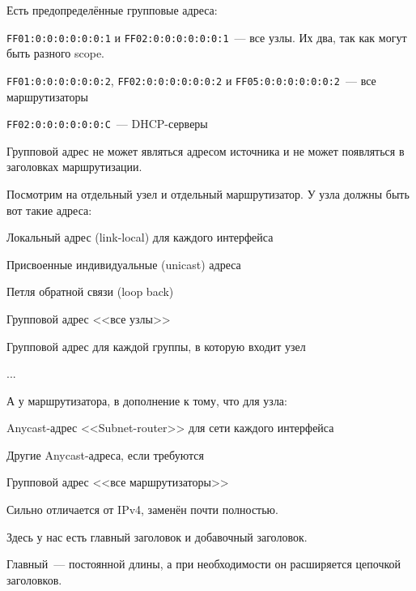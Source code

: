 Есть предопределённые групповые адреса:
\begin{MyItemize}
    \item {\tt FF01:0:0:0:0:0:0:1} и {\tt FF02:0:0:0:0:0:0:1}~--- все узлы. Их два, так как могут быть разного scope.
    \item {\tt FF01:0:0:0:0:0:0:2}, {\tt FF02:0:0:0:0:0:0:2} и {\tt FF05:0:0:0:0:0:0:2}~--- все маршрутизаторы
    \item {\tt FF02:0:0:0:0:0:0:С}~--- DHCP-серверы
\end{MyItemize}

Групповой адрес не может являться адресом источника и не может появляться в заголовках маршрутизации.


Посмотрим на отдельный узел и отдельный маршрутизатор. У узла должны быть вот такие адреса:
\begin{MyItemize}
    \item Локальный адрес (link-local) для каждого интерфейса
    \item Присвоенные индивидуальные (unicast) адреса
    \item Петля обратной связи (loop back)
    \item Групповой адрес <<все узлы>>
    \item Групповой адрес для каждой группы, в которую входит узел
    \item ...
\end{MyItemize}

А у маршрутизатора, в дополнение к тому, что для узла:
\begin{MyItemize}
    \item Anycast-адрес <<Subnet-router>> для сети каждого интерфейса
    \item Другие Anycast-адреса, если требуются
    \item Групповой адрес <<все маршрутизаторы>>
\end{MyItemize}


Сильно отличается от IPv4, заменён почти полностью.


Здесь у нас есть главный заголовок и добавочный заголовок.

Главный~--- постоянной длины, а при необходимости он расширяется цепочкой заголовков.


